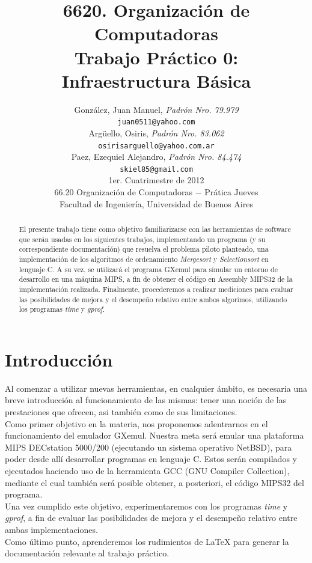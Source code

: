 \documentclass[a4paper,10pt]{article}
\title{ \textbf{ 6620. Organizaci\'on de Computadoras\\
Trabajo Pr\'actico 0: \\
Infraestructura B\'asica}}
\author{	Gonz\'alez, Juan Manuel, \textit{Padr\'on Nro. 79.979} \\
            	\texttt{ juan0511@yahoo.com } \\[2.5ex]
            	Arg\"uello, Osiris, \textit{Padr\'on Nro. 83.062} \\
            	\texttt{ osirisarguello@yahoo.com.ar } \\[2.5ex]
		Paez, Ezequiel Alejandro, \textit{Padr\'on Nro. 84.474} \\
		\texttt{ skiel85@gmail.com } \\[2.5ex]
            	\normalsize{1er. Cuatrimestre de 2012} \\
            	\normalsize{66.20 Organizaci\'on de Computadoras  $-$ Pr\'atica Jueves} \\
            	\normalsize{Facultad de Ingenier\'ia, Universidad de Buenos Aires} \\
       }
\date{}
\begin{document}
\maketitle
\thispagestyle{empty}  %


\begin{abstract}
El presente trabajo tiene como objetivo familiarizarse con las herramientas de software que ser\'an usadas en los siguientes trabajos, implementando un programa (y su correspondiente documentaci\'on) que resuelva el problema piloto planteado, una implementaci\'on de los algoritmos de ordenamiento \textit{Mergesort} y \textit{Selectionsort} en lenguaje C. A su vez, se utilizar\'a el programa GXemul para simular un entorno de desarrollo en una m\'aquina MIPS, a fin de obtener el c\'odigo en Assembly MIPS32 de la implementaci\'on realizada. Finalmente, procederemos a realizar mediciones para evaluar las posibilidades de mejora y el desempe\~no relativo entre ambos algorimos, utilizando los programas \textit{time} y \textit{gprof}.


\end{abstract}

\pagebreak

\setcounter{page}{2}
\section{Introducci\'on}
Al comenzar a utilizar nuevas herramientas, en cualquier \'ambito, es necesaria una breve introducci\'on al funcionamiento de las mismas: tener una noci\'on de las prestaciones que ofrecen, asi tambi\'en como de sus limitaciones.\\
Como primer objetivo en la materia, nos proponemos adentrarnos en el funcionamiento del emulador GXemul. Nuestra meta ser\'a emular una plataforma MIPS DECstation 5000/200 (ejecutando un sistema operativo NetBSD), para poder desde all\'i desarrollar programas en lenguaje C. Estos ser\'an compilados y ejecutados haciendo uso de la herramienta GCC (GNU Compiler Collection), mediante el cual tambi\'en ser\'a posible obtener, a posteriori, el c\'odigo MIPS32 del programa.\\
Una vez cumplido este objetivo, experimentaremos con los programas \textit{time} y \textit{gprof}, a fin de evaluar las posibilidades de mejora y el desempe\~no relativo entre ambas implementaciones.\\
Como \'ultimo punto, aprenderemos los rudimientos de \LaTeX{} para generar la documentaci\'on relevante al trabajo pr\'actico.
\end{document}
